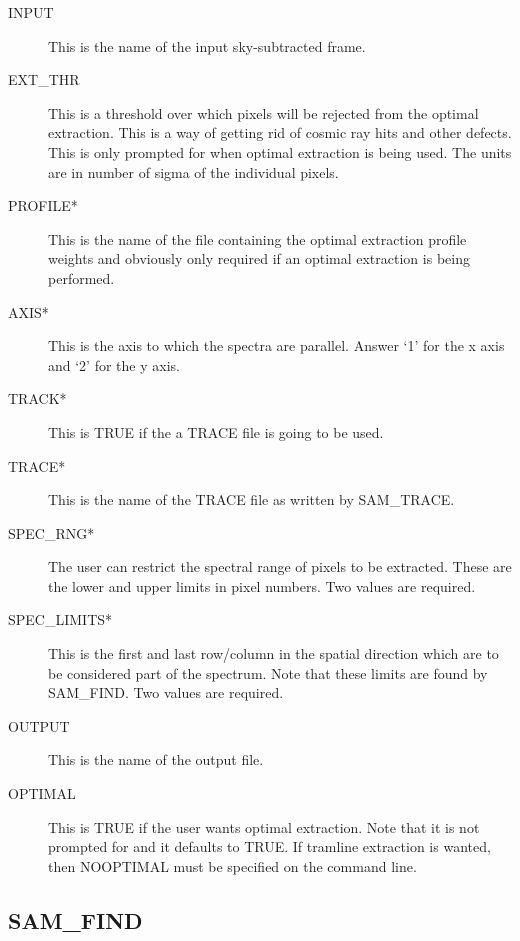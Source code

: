 \begin{description}

\item[INPUT]  This is the name of the input sky-subtracted frame.

\item[EXT\_THR] This is a threshold over which pixels will be rejected from
the optimal extraction.  This is a way of getting rid of cosmic ray hits and
other defects.  This is only prompted for when optimal extraction is being
used.  The units are in number of sigma of the individual pixels.

\item[PROFILE*] This is the name of the file containing the optimal extraction
profile weights and obviously only required if an optimal extraction is being
performed.

\item[AXIS*] This is the axis to which the spectra are parallel.  Answer `1'
for the x axis and `2' for the y axis.

\item[TRACK*] This is TRUE if the a TRACE file is going to be used.

\item[TRACE*] This is the name of the TRACE file as written by SAM\_TRACE.

\item[SPEC\_RNG*] The user can restrict the spectral range of pixels to be
extracted. These are the lower and upper limits in pixel numbers.  Two values
are required.

\item[SPEC\_LIMITS*] This is the first and last row/column in the spatial
direction which are to be considered part of the spectrum.  Note that these
limits are found by SAM\_FIND. Two values are required.

\item[OUTPUT] This is the name of the output file.

\item[OPTIMAL]  This is TRUE if the user wants optimal extraction.  Note that
it is not prompted for and it defaults to TRUE.  If tramline extraction is
wanted, then NOOPTIMAL must be specified on the command line.

\end{description}

\subsection{SAM\_FIND}

